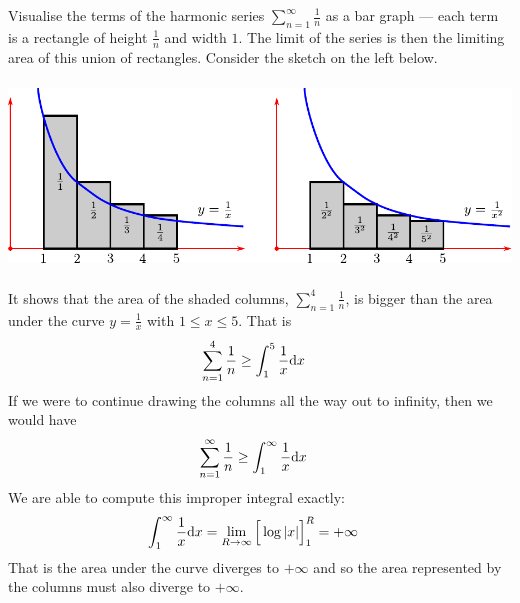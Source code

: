\begin{eg}\label{eg:firstIntTest}
Visualise the terms of the harmonic series $\sum_{n=1}^\infty\frac{1}{n}$
as a bar graph --- each term is a rectangle of
height $\frac{1}{n}$ and width $1$. The limit of the series is then the limiting area of this union of rectangles. Consider the sketch
on the left below.
\begin{wfig}
 \begin{center}
  \includegraphics[height=5cm]{harmonic_int.pdf}
 \end{center}
\end{wfig}
It shows that the area of the shaded columns, $\sum_{n=1}^4\frac{1}{n}$,
is bigger than the area under the curve $y=\frac{1}{x}$ with
$1\le x\le 5$. That is
\begin{align*}
  \sum_{n=1}^4 \frac{1}{n}
  & \ge \int_1^5 \frac{1}{x}\mathrm{d}x
\end{align*}
If we were to continue drawing the columns all the way out to infinity,
then we would have
\begin{align*}
  \sum_{n=1}^\infty \frac{1}{n}
  & \ge \int_1^\infty \frac{1}{x}\mathrm{d}x
\end{align*}
We are able to compute this improper integral exactly:
\begin{align*}
  \int_1^\infty \frac{1}{x} \mathrm{d}x
  &= \lim_{R \to \infty} \Big[ \log|x| \Big]_1^R
  = +\infty
\end{align*}
That is the area under the curve diverges to $+\infty$ and so the area represented by the columns must also diverge to
$+\infty$.


\end{eg}
